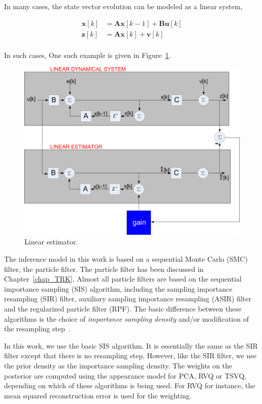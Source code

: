 In many cases, the state vector evolution can be modeled as a linear system,

\begin{align}
\mathbf{x}[k] &= \mathbf{A}\mathbf{x}[k-1] +  \mathbf{B}\mathbf{u}[k]\\
\mathbf{z}[k] &= \mathbf{A}\mathbf{x}[k] +  \mathbf{v}[k]\\
\end{align}

In such cases, One such example is given in Figure~\ref{TRK_overviewDiagram}.  

								\begin{figure}[t]
								\center
								\includegraphics[width=1.0\textwidth]{thesis/TRK_LinearEstimator_blockDiagram.pdf}
								\caption{Linear estimator.}
								\label{TRK_overviewDiagram}
								\end{figure}


The inference model in this work is based on a sequential Monte Carlo (SMC) filter, the particle filter.  The particle filter has been discussed in Chapter~\ref{chap_TRK}.  Almost all particle filters are based on the sequential importance sampling (SIS) algorithm, including the sampling importance resampling (SIR) filter, auxiliary sampling importance resampling (ASIR) filter and the regularized particle filter (RPF).  The basic difference between these algorithms is the choice of \emph{importance sampling density} and/or modification of the resampling step~\cite{2002_JNL_PF_Arulampalam}.  

In this work, we use the basic SIS algorithm.  It is essentially the same as the SIR filter except that there is no resampling step.  However, like the SIR filter, we use the prior density as the importance sampling density.  The weights on the posterior are computed using the appearance model for PCA, RVQ or TSVQ, depending on which of these algorithms is being used.  For RVQ for instance, the mean squared reconstruction error is used for the weighting.

